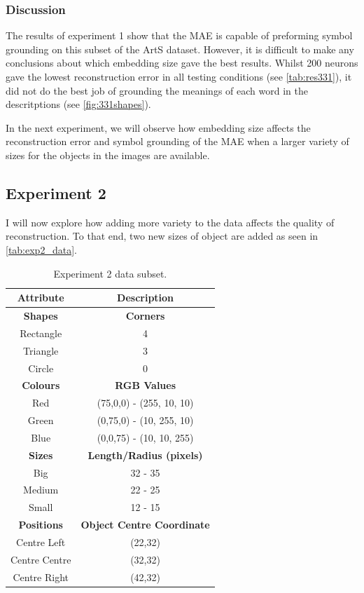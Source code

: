 \subsubsection{Discussion}
The results of experiment 1 show that the MAE is capable of preforming symbol grounding on this subset of the ArtS dataset. However, it is difficult to make any conclusions about which embedding size gave the best results. Whilst 200 neurons gave the lowest reconstruction error in all testing conditions (see \autoref{tab:res331}), it did not do the best job of grounding the meanings of each word in the descritptions (see \autoref{fig:331shapes}). 

In the next experiment, we will observe how embedding size affects the reconstruction error and symbol grounding of the MAE when a larger variety of sizes for the objects in the images are available.


\newpage
\subsection{Experiment 2}
I will now explore how adding more variety to the data affects the quality of reconstruction. To that end, two new sizes of object are added as seen in \autoref{tab:exp2_data}. 

\begin{table}[ht]
\centering
\begin{tabular}{|c|c|}
\hline
\textbf{Attribute} & \textbf{Description} \\ \hline \hline
\textbf{Shapes} & \textbf{Corners} \\ \hline
Rectangle & 4\\ \hline
Triangle & 3\\ \hline
Circle & 0\\ \hline 

\textbf{Colours} & \textbf{RGB Values}	\\ \hline	
Red & (75,0,0) - (255, 10, 10)\\ \hline
Green  & (0,75,0) - (10, 255, 10)\\ \hline
Blue   & (0,0,75) - (10, 10, 255)\\ \hline


\textbf{Sizes} & 	\textbf{Length/Radius (pixels)} \\ \hline			  
Big    & 32 - 35  \\ \hline
Medium & 22 - 25 \\ \hline
Small  & 12 - 15 \\ \hline 

\textbf{Positions} & \textbf{Object Centre Coordinate}	\\ \hline					  
Centre Left &(22,32)\\ \hline
Centre Centre & (32,32)\\ \hline
Centre Right &(42,32)\\ \hline				
\end{tabular}
\caption{Experiment 2 data subset.}
\label{tab:exp2_data} 
\end{table}



